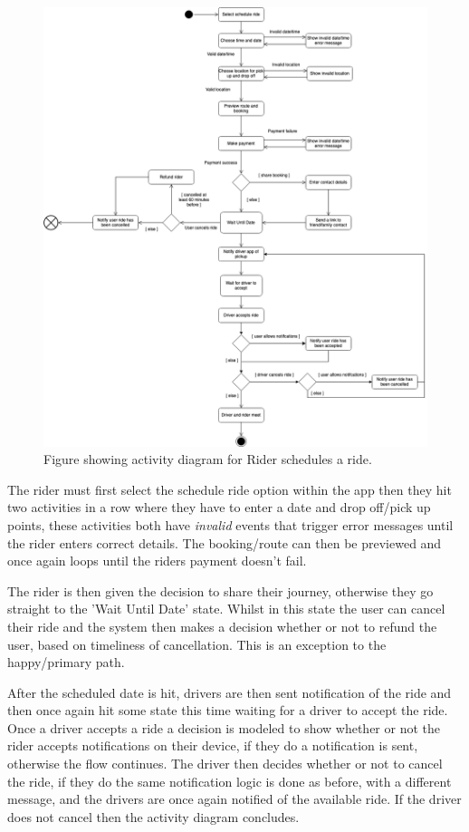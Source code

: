 \documentclass{article}
\begin{document}
    \begin{figure}[H]
      \centering
      \includegraphics[width=11.5cm]{assets/activity_diagram.drawio.png}
      \caption{Figure showing activity diagram for Rider schedules a ride.}
      \label{fig:activityDiagram}
    \end{figure}

    \newpage
    The rider must first select the schedule ride option within the app then they hit two activities in a row where they have to enter a date and drop off/pick up 
    points, these activities both have \textit{invalid} events that trigger error messages until the rider enters correct details. The booking/route can then be previewed
    and once again loops until the riders payment doesn't fail.

    The rider is then given the decision to share their journey, otherwise they go straight to the 'Wait Until Date' state. Whilst in this state the user can cancel 
    their ride and the system then makes a decision whether or not to refund the user, based on timeliness of cancellation. This is an exception to the happy/primary path.

    After the scheduled date is hit, drivers are then sent notification of the ride and then once again hit some state this time waiting for a driver to accept the ride.
    Once a driver accepts a ride a decision is modeled to show whether or not the rider accepts notifications on their device, if they do a notification is sent, 
    otherwise the flow continues. The driver then decides whether or not to cancel the ride, if they do the same notification logic is done as before, with a different
    message, and the drivers are once again notified of the available ride. If the driver does not cancel then the activity diagram concludes.
\end{document}
